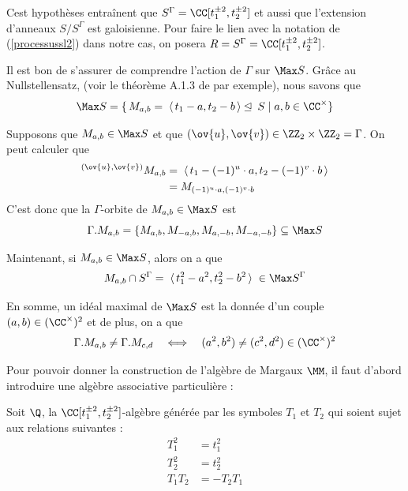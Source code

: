 Cest hypothèses entraînent que $S^\Gamma = \CC[t_1^{\pm 2},t_2^{\pm 2}]$ et aussi que l'extension d'anneaux $S/S^\Gamma$ est galoisienne. Pour faire le lien avec la notation de (\ref{processussl2}) dans notre cas, on posera \linebreak $R = S^\Gamma = \CC[t_1^{\pm 2},t_2^{\pm 2}]$.

Il est bon de s'assurer de comprendre l'action de $\Gamma$ sur $\Max S$. Grâce au Nullstellensatz, (voir le théorème A.1.3 de \cite{GWsym} par exemple), nous savons que 
$$ \Max S = \{\,M_{a,b} = \; \langle \, t_1 - a,t_2 - b \, \rangle \unlhd \; S \; | \; a,b \in \CC^\times \} $$ 

Supposons que $M_{a,b} \in \Max S$ et que $(\ov{u},\ov{v}) \in \ZZ_2 \times \ZZ_2 = \Gamma$. On peut calculer que
\begin{align*}
{}^{(\ov{u},\ov{v})} M_{a,b} &= \; \langle \, t_1- (-1)^{u} \cdot a,t_2- (-1)^{v} \cdot b \, \rangle\\
&= M_{(-1)^{u} \cdot a,(-1)^{v} \cdot b}
\end{align*}
C'est donc que la $\Gamma$-orbite de $M_{a,b} \in \Max S$ est
\begin{equation}
\Gamma.M_{a,b} = \{M_{a,b},M_{-a,b},M_{a,-b},M_{-a,-b}\} \subseteq \Max S 
\end{equation}

Maintenant, si $M_{a,b} \in \Max S$, alors on a que
$$ M_{a,b} \cap S^\Gamma = \; \langle \, t_1^2 - a^2,t_2^2 - b^2 \, \rangle \; \in \Max S^\Gamma $$

\begin{Rem} En somme, un idéal maximal de $\Max S$ est la donnée d'un couple \linebreak $(a,b) \in (\CC^\times)^2$ et de plus, on a que
$$ \Gamma.M_{a,b} \neq \Gamma.M_{c,d} \quad \Longleftrightarrow \quad (a^2,b^2) \neq (c^2,d^2) \in (\CC^\times)^2 $$
\end{Rem}

Pour pouvoir donner la construction de l'algèbre de Margaux $\MM$, il faut d'abord introduire une algèbre associative particulière :

\begin{Def} \label{quatgen} Soit $\Q$, la $\CC[t_1^{\pm 2},t_2^{\pm 2}]$-algèbre générée par les symboles $T_1$ et $T_2$ qui soient sujet aux relations suivantes :
\begin{align*}
T_1^2 &= t_1^2\\
T_2^2 &= t_2^2\\
T_1T_2 &= -T_2 T_1 
\end{align*}
\end{Def}


